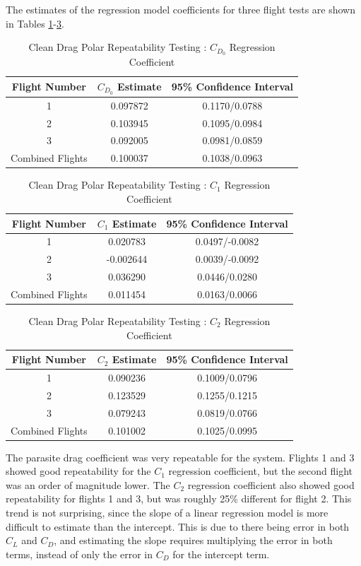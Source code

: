 The estimates of the regression model coefficients for three flight tests are shown in Tables \ref{table:cd0RepeatClean}-\ref{table:k2RepeatClean}.
\newpage
\begin{table}[H]
\caption{Clean Drag Polar Repeatability Testing : $C_{D_0}$ Regression Coefficient}
\label{table:cd0RepeatClean}
\centering
\begin{tabular}{c c c}
\hline\hline
 Flight Number & $C_{D_0}$ Estimate & 95\% Confidence Interval \\
 \hline
1 & 0.097872 &  0.1170/0.0788 \\
2 & 0.103945 & 0.1095/0.0984 \\
3 & 0.092005 & 0.0981/0.0859 \\
\hline \hline
Combined Flights & 0.100037 & 0.1038/0.0963\\
\hline
\end{tabular}
\end{table}

\begin{table}[H]
\caption{Clean Drag Polar Repeatability Testing : $C_1$ Regression Coefficient}
\label{table:c1RepeatClean}
\centering
\begin{tabular}{c c c}
\hline\hline
Flight Number & $C_1$ Estimate & 95\% Confidence Interval \\
 \hline
1 & 0.020783 & 0.0497/-0.0082\\
2 & -0.002644 & 0.0039/-0.0092 \\
3 & 0.036290 & 0.0446/0.0280\\
\hline \hline
Combined Flights & 0.011454 & 0.0163/0.0066\\
\hline
\end{tabular}
\end{table}

\begin{table}[H]
\caption{Clean Drag Polar Repeatability Testing : $C_2$ Regression Coefficient}
\label{table:k2RepeatClean}
\centering
\begin{tabular}{c c c}
\hline\hline
Flight Number & $C_2$ Estimate & 95\% Confidence Interval \\
 \hline
1 & 0.090236 & 0.1009/0.0796 \\
2 & 0.123529 & 0.1255/0.1215 \\
3 & 0.079243 &  0.0819/0.0766\\
\hline \hline
Combined Flights& 0.101002 & 0.1025/0.0995 \\
\hline
\end{tabular}
\end{table}
The parasite drag coefficient was very repeatable for the system. Flights 1 and 3 showed good repeatability for the $C_1$ regression coefficient, but the second flight was an order of magnitude lower. The $C_2$ regression coefficient also showed good repeatability for flights 1 and 3, but was roughly 25\% different for flight 2. This trend is not surprising, since the slope of a linear regression model is more difficult to estimate than the intercept. This is due to there being error in both $C_L$ and $C_D$, and estimating the slope requires multiplying the error in both terms, instead of only the error in $C_D$ for the intercept term.

